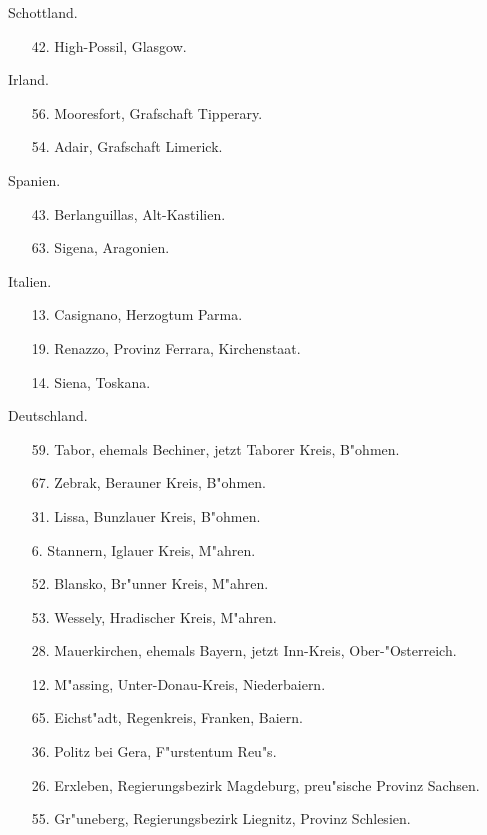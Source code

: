 \documentclass[a4paper, 11pt, oneside, polutonikogreek, german]{article}
\begin{document}
\begin{center}
Schottland.
\end{center}
\begin{itemize}
    
    \item[42.] High-Possil, Glasgow.
\end{itemize}
\begin{center}
Irland.
\end{center}
\begin{itemize}
    
    \item[56.] Mooresfort, Grafschaft Tipperary.
    \item[54.] Adair, Grafschaft Limerick.
\end{itemize}
\begin{center}
Spanien.
\end{center}
\begin{itemize}
    
    \item[43.] Berlanguillas, Alt-Kastilien.
    \item[63.] Sigena, Aragonien.
\end{itemize}
\begin{center}
Italien.
\end{center}
\begin{itemize}
    
    \item[13.] Casignano, Herzogtum Parma.
    \item[19.] Renazzo, Provinz Ferrara, Kirchenstaat.
    \item[14.] Siena, Toskana.
\end{itemize}
\begin{center}
Deutschland.
\end{center}
\begin{itemize}
    
    \item[59.] Tabor, ehemals Bechiner, jetzt Taborer Kreis, B"ohmen.
    \item[67.] Zebrak, Berauner Kreis, B"ohmen.
    \item[31.] Lissa, Bunzlauer Kreis, B"ohmen.
    \item[6.] Stannern, Iglauer Kreis, M"ahren.
    \item[52.] Blansko, Br"unner Kreis, M"ahren.
    \item[53.] Wessely, Hradischer Kreis, M"ahren.
    \item[28.] Mauerkirchen, ehemals Bayern, jetzt Inn-Kreis, Ober-"Osterreich.
    \item[12.] M"assing, Unter-Donau-Kreis, Niederbaiern.
    \item[65.] Eichst"adt, Regenkreis, Franken, Baiern.
    \item[36.] Politz bei Gera, F"urstentum Reu"s.
    \item[26.] Erxleben, Regierungsbezirk Magdeburg, preu"sische Provinz Sachsen.
    \item[55.] Gr"uneberg, Regierungsbezirk Liegnitz, Provinz Schlesien.
\end{itemize}
\end{document}
